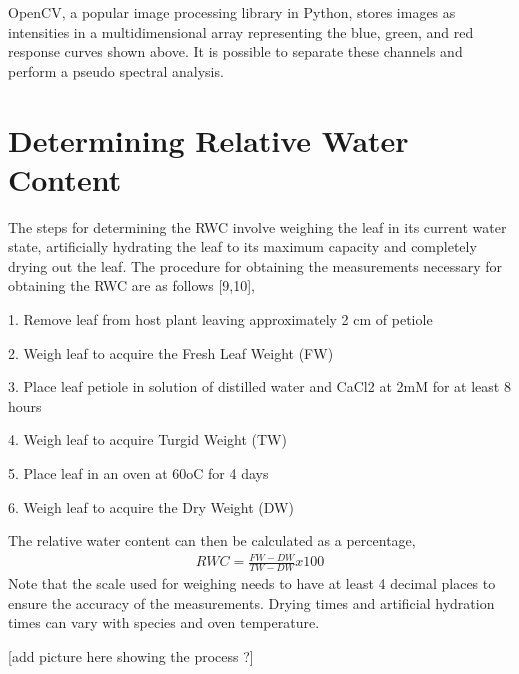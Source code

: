 OpenCV, a popular image processing library in Python, stores images as intensities in a multidimensional array representing the blue, green, and red response curves shown above.  It is possible to separate these channels and perform a pseudo spectral analysis.

\section{Determining Relative Water Content}
The steps for determining the RWC involve weighing the leaf in its current water state, artificially hydrating the leaf to its maximum capacity and completely drying out the leaf.  The procedure for obtaining the measurements necessary for obtaining the RWC are as follows [9,10],

1.	Remove leaf from host plant leaving approximately 2 cm of petiole

2.	Weigh leaf to acquire the Fresh Leaf Weight (FW)

3.	Place leaf petiole in solution of distilled water and CaCl2 at 2mM for at least 8 hours

4.	Weigh leaf to acquire Turgid Weight (TW)

5.	Place leaf in an oven at 60oC for 4 days

6.	Weigh leaf to acquire the Dry Weight (DW)


The relative water content can then be calculated as a percentage,
%
\begin{align}
    RWC = \frac{FW - DW}{TW - DW} x 100%
\end{align}
%
Note that the scale used for weighing needs to have at least 4 decimal places to ensure the accuracy of the measurements. Drying times and artificial hydration times can vary with species and oven temperature.

[add picture here showing the process ?]
